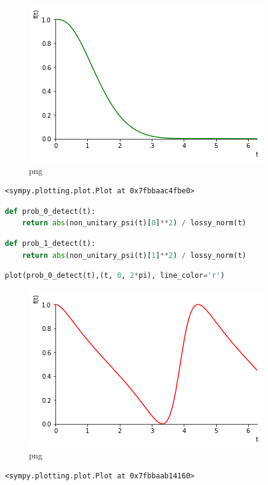 \begin{figure}
\centering
\includegraphics[width=0.66\linewidth]{output_30_0.png}
\caption{png}
\end{figure}

\begin{lstlisting}
<sympy.plotting.plot.Plot at 0x7fbbaac4fbe0>
\end{lstlisting}

\begin{lstlisting}[language=Python]
def prob_0_detect(t):
    return abs(non_unitary_psi(t)[0]**2) / lossy_norm(t)
\end{lstlisting}

\begin{lstlisting}[language=Python]
def prob_1_detect(t):
    return abs(non_unitary_psi(t)[1]**2) / lossy_norm(t)
\end{lstlisting}

\begin{lstlisting}[language=Python]
plot(prob_0_detect(t),(t, 0, 2*pi), line_color='r')
\end{lstlisting}

\begin{figure}
\centering
\includegraphics[width=0.66\linewidth]{output_33_0.png}
\caption{png}
\end{figure}

\begin{lstlisting}
<sympy.plotting.plot.Plot at 0x7fbbaab14160>
\end{lstlisting}

